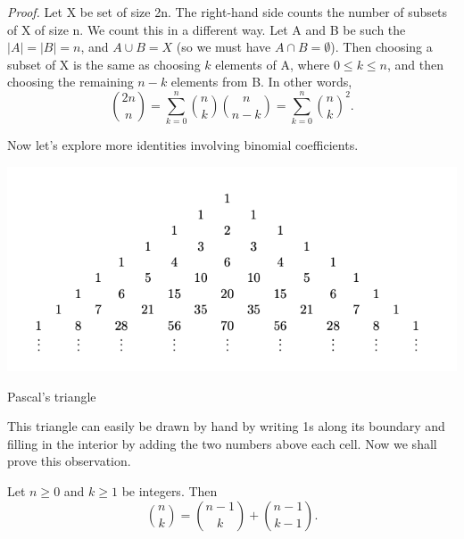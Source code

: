 \documentclass{tufte-handout}
\begin{document}
\textit{Proof.} Let X be set of size 2n. The right-hand side counts the number of subsets of X of size n.
We count this in a different way. Let A and B be such the \( \left|A\right| = \left|B\right| = n \),
and \( A\cup B = X \) (so we must have \( A \cap B = \emptyset \)). Then
choosing a subset of X is the same as choosing \( k \) elements of A, where \( 0 \leq k \leq n \),
and then choosing the remaining \( n-k \) elements from B. In other words,
\[\binom{2n}{n} = \sum_{k=0}^{n}\binom{n}{k}\binom{n}{n-k} = \sum_{k=0}^{n}\binom{n}{k}^2.\]
\hfill \qedsymbol

Now let's explore more identities involving binomial coefficients.

\includegraphics{Pascel's_triangle_2.png}\\
\label{fig:pascal_triangle}
\begin{center}
    Pascal's triangle
\end{center}

This triangle can easily be drawn by hand by writing 1s along its boundary and filling in the interior
by adding the two numbers above each cell. Now we shall prove this observation.

\begin{Proposition}
    Let \( n \geq 0 \) and \( k\geq 1 \) be integers. Then
    \[\binom{n}{k} = \binom{n-1}{k} + \binom{n-1}{k-1}.\]
\end{Proposition}
\end{document}

